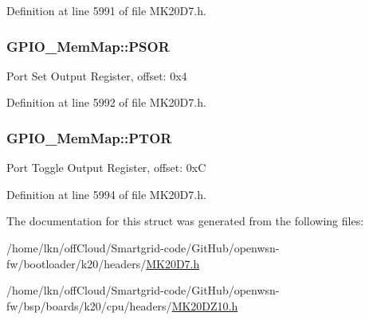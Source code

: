 Definition at line 5991 of file M\+K20\+D7.\+h.

\subsubsection[{\texorpdfstring{P\+S\+OR}{PSOR}}]{ G\+P\+I\+O\+\_\+\+Mem\+Map\+::\+P\+S\+OR}\hypertarget{struct_g_p_i_o___mem_map_a14833f065ec123137ccce5ab873b5879}{}\label{struct_g_p_i_o___mem_map_a14833f065ec123137ccce5ab873b5879}
Port Set Output Register, offset\+: 0x4 

Definition at line 5992 of file M\+K20\+D7.\+h.

\subsubsection[{\texorpdfstring{P\+T\+OR}{PTOR}}]{ G\+P\+I\+O\+\_\+\+Mem\+Map\+::\+P\+T\+OR}\hypertarget{struct_g_p_i_o___mem_map_a03faa882b5f4554ff4c11954c2d8759b}{}\label{struct_g_p_i_o___mem_map_a03faa882b5f4554ff4c11954c2d8759b}
Port Toggle Output Register, offset\+: 0xC 

Definition at line 5994 of file M\+K20\+D7.\+h.



The documentation for this struct was generated from the following files\+:\begin{DoxyCompactItemize}
\item 
/home/lkn/off\+Cloud/\+Smartgrid-\/code/\+Git\+Hub/openwsn-\/fw/bootloader/k20/headers/\hyperlink{bootloader_2k20_2headers_2_m_k20_d7_8h}{M\+K20\+D7.\+h}\item 
/home/lkn/off\+Cloud/\+Smartgrid-\/code/\+Git\+Hub/openwsn-\/fw/bsp/boards/k20/cpu/headers/\hyperlink{_m_k20_d_z10_8h}{M\+K20\+D\+Z10.\+h}\end{DoxyCompactItemize}
